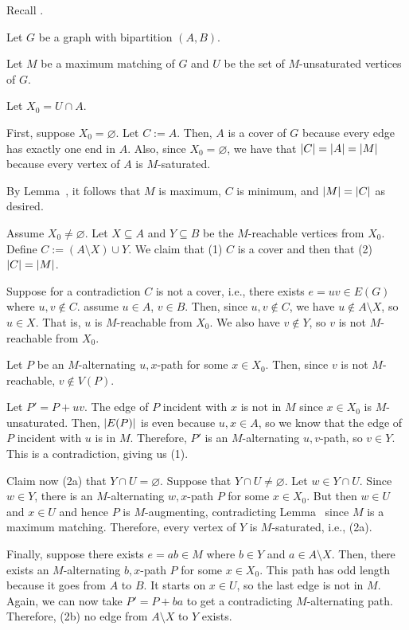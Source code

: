 Recall .

\begin{prf}
  Let $G$ be a graph with bipartition $(A, B)$.

  Let $M$ be a maximum matching of $G$ and
  $U$ be the set of $M$-unsaturated vertices of $G$.

  Let $X_0 = U \cap A$.

  First, suppose $X_0 = \varnothing$.
  Let $C := A$. Then, $A$ is a cover of $G$
  because every edge has exactly one end in $A$.
  Also, since $X_0 = \varnothing$, we have that $\abs{C} = \abs{A} = \abs{M}$
  because every vertex of $A$ is $M$-saturated.
  
  By Lemma~, it follows that $M$ is maximum, $C$ is minimum,
  and $\abs{M} = \abs{C}$ as desired.

  Assume $X_0 \neq \varnothing$.
  Let $X \subseteq A$ and $Y \subseteq B$ be the $M$-reachable vertices from $X_0$.
  Define $C := (A \setminus X) \cup Y$.
  We claim that (1) $C$ is a cover and then that (2) $\abs{C} = \abs{M}$.

  Suppose for a contradiction $C$ is not a cover, i.e.,
  there exists $e = uv \in E(G)$ where $u,v \not\in C$.
  \WLOG assume $u \in A$, $v \in B$.
  Then, since $u,v \not\in C$,
  we have $u \not\in A \setminus X$, so $u \in X$.
  That is, $u$ is $M$-reachable from $X_0$.
  We also have $v \not\in Y$, so $v$ is not $M$-reachable from $X_0$.

  Let $P$ be an $M$-alternating $u,x$-path for some $x \in X_0$.
  Then, since $v$ is not $M$-reachable, $v \not\in V(P)$.

  Let $P' = P + uv$.
  The edge of $P$ incident with $x$ is not in $M$ since $x \in X_0$ is $M$-unsaturated.
  Then, $\abs{E(P)}$ is even because $u,x \in A$,
  so we know that the edge of $P$ incident with $u$ is in $M$.
  Therefore, $P'$ is an $M$-alternating $u,v$-path, so $v \in Y$.
  This is a contradiction, giving us (1).

  Claim now (2a) that $Y \cap U = \varnothing$.
  Suppose that $Y \cap U \neq \varnothing$.
  Let $w \in Y \cap U$.
  Since $w \in Y$, there is an $M$-alternating $w,x$-path $P$ for some $x \in X_0$.
  But then $w \in U$ and $x \in U$ and hence $P$ is $M$-augmenting,
  contradicting Lemma~ since $M$ is a maximum matching.
  Therefore, every vertex of $Y$ is $M$-saturated, i.e., (2a).

  Finally, suppose there exists $e = ab \in M$
  where $b \in Y$ and $a \in A \setminus X$.
  Then, there exists an $M$-alternating $b,x$-path $P$ for some $x \in X_0$.
  This path has odd length because it goes from $A$ to $B$.
  It starts on $x \in U$, so the last edge is not in $M$.
  Again, we can now take $P' = P + ba$
  to get a contradicting $M$-alternating path.
  Therefore, (2b) no edge from $A \setminus X$ to $Y$ exists.


\end{prf}
